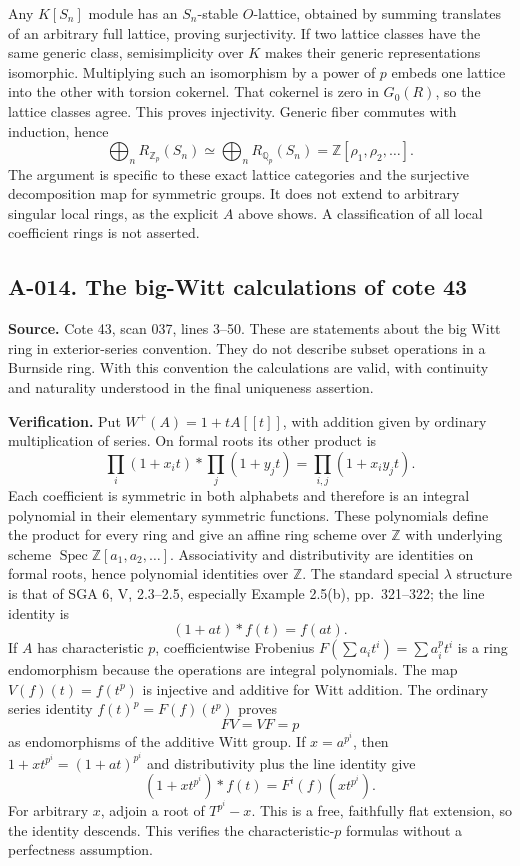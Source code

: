 \documentclass[11pt]{article}
\begin{document}
Any $K[S_n]$ module has an $S_n$-stable $O$-lattice, obtained by
summing translates of an arbitrary full lattice, proving surjectivity.
If two lattice classes have the same generic class, semisimplicity
over $K$ makes their generic representations isomorphic. Multiplying
such an isomorphism by a power of $p$ embeds one lattice into the
other with torsion cokernel. That cokernel is zero in $G_0(R)$, so
the lattice classes agree. This proves injectivity. Generic fiber
commutes with induction, hence
\[
 \bigoplus_n R_{\mathbb Z_p}(S_n)\simeq
 \bigoplus_n R_{\mathbb Q_p}(S_n)=\mathbb Z[\rho_1,\rho_2,\ldots].
\]
The argument is specific to these exact lattice categories and the
surjective decomposition map for symmetric groups. It does not extend
to arbitrary singular local rings, as the explicit $A$ above shows.
A classification of all local coefficient rings is not asserted.


\subsection*{A-014. The big-Witt calculations of cote 43}
\textbf{Source.} Cote 43, scan 037, lines 3--50. These are statements
about the big Witt ring in exterior-series convention. They do not
describe subset operations in a Burnside ring. With this convention
the calculations are valid, with continuity and naturality understood
in the final uniqueness assertion.

\textbf{Verification.} Put $W^+(A)=1+tA[[t]]$, with addition given
by ordinary multiplication of series. On formal roots its other
product is
\[
 \prod_i(1+x_it)*\prod_j(1+y_jt)=\prod_{i,j}(1+x_iy_jt).
\]
Each coefficient is symmetric in both alphabets and therefore is
an integral polynomial in their elementary symmetric functions.
These polynomials define the product for every ring and give an
affine ring scheme over $\mathbb Z$ with underlying scheme
$\operatorname{Spec}\mathbb Z[a_1,a_2,\ldots]$. Associativity and
distributivity are identities on formal roots, hence polynomial
identities over $\mathbb Z$. The standard special $\lambda$
structure is that of SGA 6, V, 2.3--2.5, especially Example 2.5(b), pp.~321--322; the line identity is
\[
 (1+at)*f(t)=f(at).
\]
If $A$ has characteristic $p$, coefficientwise Frobenius
$F(\sum a_it^i)=\sum a_i^pt^i$ is a ring endomorphism because
the operations are integral polynomials. The map $V(f)(t)=f(t^p)$
is injective and additive for Witt addition. The ordinary series
identity $f(t)^p=F(f)(t^p)$ proves
\[
 FV=VF=p
\]
as endomorphisms of the additive Witt group. If $x=a^{p^i}$, then
$1+xt^{p^i}=(1+at)^{p^i}$ and distributivity plus the line identity
give
\[
 (1+xt^{p^i})*f(t)=F^i(f)(xt^{p^i}).
\]
For arbitrary $x$, adjoin a root of $T^{p^i}-x$. This is a free,
faithfully flat extension, so the identity descends. This verifies
the characteristic-$p$ formulas without a perfectness assumption.
\end{document}
